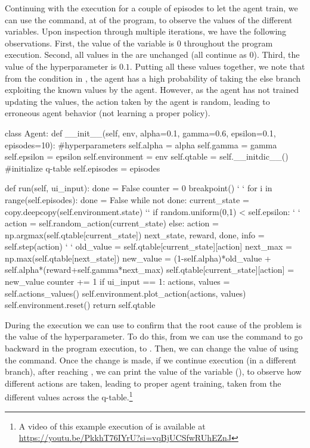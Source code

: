 Continuing with the execution for a couple of episodes to let the agent train, we can use the 
 command, at  of the program, to observe the values of the different 
variables. Upon inspection through multiple iterations, we have the following observations. First, the 
value of the  variable is $0$ throughout the program execution. Second, all values in the 
 are unchanged (all continue as 0). Third, the value of the  hyperparameter is 
$0.1$. Putting all these values together, we note that from the condition in , the agent 
has a high probability of taking the else branch exploiting the known values by the agent. However, 
as the agent has not trained updating the values, the action taken by the agent is random,
leading to erroneous agent behavior (\ie not learning a proper policy).

\begin{python}[numbers=left,
	caption={\flik running example of the Gridworld environment},
	label={lst:gridworld-learner}]
class Agent:
  def __init__(self, env, alpha=0.1, gamma=0.6, epsilon=0.1, episodes=10):
    #hyperparameters
    self.alpha = alpha
    self.gamma = gamma
    self.epsilon = epsilon
    self.environment = env
    self.qtable = self.__initdic__() #initialize q-table
    self.episodes = episodes
    
  def run(self, ui_input):
      done = False
      counter = 0
      breakpoint()  ` \label{ln:breakpoint} `
      for i in range(self.episodes):
        done = False
        while not done:
          current_state = copy.deepcopy(self.environment.state) `\label{ln:back1}`
          if random.uniform(0,1) < self.epsilon:   ` \label{ln:stop1} `
            action = self.random_action(current_state)
          else:
            action = np.argmax(self.qtable[current_state])  
          next_state, reward, done, info = self.step(action) ` \label{ln:stop2} `
          old_value = self.qtable[current_state][action]
          next_max = np.max(self.qtable[next_state])
          new_value = (1-self.alpha)*old_value + self.alpha*(reward+self.gamma*next_max)
          self.qtable[current_state][action] = new_value
          counter += 1
        if ui_input == 1:
          actions, values = self.actions_values()
          self.environment.plot_action(actions, values)
        self.environment.reset()
    return self.qtable
\end{python}

During the execution we can use \flik to confirm that the root cause of the problem is the value of the 
 hyperparameter. To do this, from  we can use the command 
 to go backward in the program execution, to . Then, we can  
change the value of  using the  command. Once the change 
is made, if we continue execution (in a different \flik branch), after reaching , we can print 
the value of the  variable (), to observe how different actions are taken, 
leading to proper agent training, taken from the different values across the q-table.\footnote{A video of 
this example execution of \flik is available at \url{https://youtu.be/PkkhT76IYrU?si=vqBjUCSfwRUhEZnJ}}

